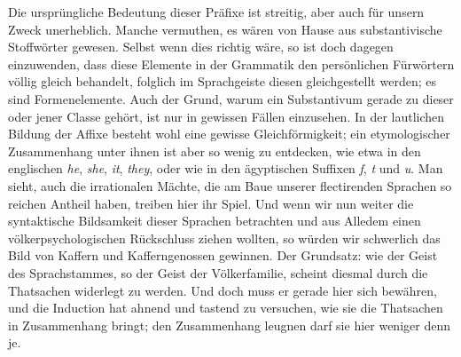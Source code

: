 \noindent\largerpage[2] Die ursprüngliche Bedeutung dieser Präfixe ist streitig, aber auch für unsern Zweck unerheblich. Manche vermuthen, es wären von Hause aus substantivische Stoffwörter gewesen. Selbst wenn dies richtig wäre, so ist doch dagegen einzuwenden, dass diese Elemente in der Grammatik den persönlichen Fürwörtern völlig gleich behandelt, folglich im Sprachgeiste diesen gleichgestellt werden; es sind  Formenelemente. Auch der Grund, warum ein Substantivum gerade zu dieser oder jener Classe gehört, ist nur in gewissen Fällen einzusehen. In der lautlichen Bildung der Affixe besteht wohl eine gewisse Gleichförmigkeit; ein etymologischer Zusammenhang unter ihnen ist aber so wenig zu entdecken, wie etwa in den englischen \textit{he}, \textit{she}, \textit{it}, \textit{they}, oder wie in den ägyptischen Suffixen \textit{f}, \textit{t} und \textit{u}. Man sieht, auch die irrationalen Mächte, die am Baue unserer flectirenden Sprachen so reichen Antheil haben, treiben hier ihr Spiel.  Und wenn wir nun weiter die syntaktische Bildsamkeit dieser Sprachen betrachten und aus Alledem einen völkerpsychologischen Rückschluss ziehen wollten, so würden wir \label{sp.422} schwerlich das Bild von Kaffern und Kafferngenossen gewinnen. Der Grundsatz: wie der Geist des Sprachstammes, so der Geist der Völkerfamilie, scheint diesmal durch die Thatsachen widerlegt zu werden. Und doch muss er gerade hier sich bewähren, und die Induction hat ahnend und tastend zu versuchen, wie sie die Thatsachen in Zusammenhang bringt; den Zusammenhang leugnen darf sie hier weniger denn je.

